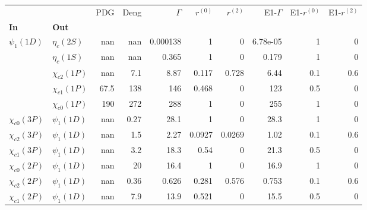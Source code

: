 \begin{tabular}{l|l|r|r|r|r|r|r|r|r}
\toprule
                &                &  PDG &  Deng &  $\Gamma$ &  $r^{(0)}$ &  $r^{(2)}$ &  E1-$\Gamma$ &  E1-$r^{(0)}$ &  E1-$r^{(2)}$ \\
\textbf{In} & \textbf{Out} &      &       &           &            &            &              &               &               \\
\midrule
\textbf{$\psi_{1}(1D)$} & \textbf{$\eta_{c}(2S)$} &  nan &   nan &  0.000138 &          1 &          0 &     6.78e-05 &             1 &             0 \\
                & \textbf{$\eta_{c}(1S)$} &  nan &   nan &     0.365 &          1 &          0 &        0.179 &             1 &             0 \\
                & \textbf{$\chi_{c2}(1P)$} &  nan &   7.1 &      8.87 &      0.117 &      0.728 &         6.44 &           0.1 &           0.6 \\
                & \textbf{$\chi_{c1}(1P)$} & 67.5 &   138 &       146 &      0.468 &          0 &          123 &           0.5 &             0 \\
                & \textbf{$\chi_{c0}(1P)$} &  190 &   272 &       288 &          1 &          0 &          255 &             1 &             0 \\
\textbf{$\chi_{c0}(3P)$} & \textbf{$\psi_{1}(1D)$} &  nan &  0.27 &      28.1 &          1 &          0 &         28.3 &             1 &             0 \\
\textbf{$\chi_{c2}(3P)$} & \textbf{$\psi_{1}(1D)$} &  nan &   1.5 &      2.27 &     0.0927 &     0.0269 &         1.02 &           0.1 &           0.6 \\
\textbf{$\chi_{c1}(3P)$} & \textbf{$\psi_{1}(1D)$} &  nan &   3.2 &      18.3 &       0.54 &          0 &         21.3 &           0.5 &             0 \\
\textbf{$\chi_{c0}(2P)$} & \textbf{$\psi_{1}(1D)$} &  nan &    20 &      16.4 &          1 &          0 &         16.9 &             1 &             0 \\
\textbf{$\chi_{c2}(2P)$} & \textbf{$\psi_{1}(1D)$} &  nan &  0.36 &     0.626 &      0.281 &      0.576 &        0.753 &           0.1 &           0.6 \\
\textbf{$\chi_{c1}(2P)$} & \textbf{$\psi_{1}(1D)$} &  nan &   7.9 &      13.9 &      0.521 &          0 &         15.5 &           0.5 &             0 \\
\bottomrule
\end{tabular}
